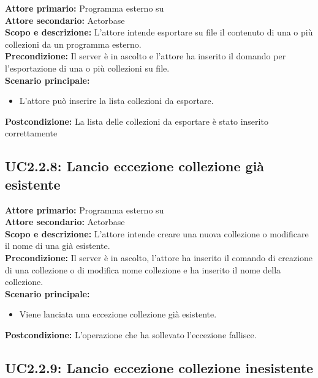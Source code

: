 \documentclass{scalatekids-article}
\begin{document}
\textbf{Attore primario:} Programma esterno su \\
\textbf{Attore secondario:} Actorbase\\
\textbf{Scopo e descrizione:} L'attore intende esportare su file il contenuto di una o più collezioni da un programma  esterno.\\
\textbf{Precondizione:} Il server è in ascolto e l'attore ha inserito il domando per l'esportazione di una o più collezioni su file.\\
\textbf{Scenario principale:}
\begin{itemize}
\item L'attore può inserire la lista collezioni da esportare.
\end{itemize}
\textbf{Postcondizione:} La lista delle collezioni da esportare è stato inserito correttamente

\subsection{UC2.2.8: Lancio eccezione collezione già esistente}

\textbf{Attore primario:} Programma esterno su \\
\textbf{Attore secondario:} Actorbase\\
\textbf{Scopo e descrizione:} L'attore intende creare una nuova collezione o modificare il nome di una già esistente.\\
\textbf{Precondizione:} Il server è in ascolto, l'attore ha inserito il comando di creazione di una collezione o di modifica nome collezione e ha inserito il nome della collezione.\\
\textbf{Scenario principale:}
\begin{itemize}
\item Viene lanciata una eccezione collezione già esistente.
\end{itemize}
\textbf{Postcondizione:} L'operazione che ha sollevato l'eccezione fallisce.

\subsection{UC2.2.9: Lancio eccezione collezione inesistente}
\end{document}
